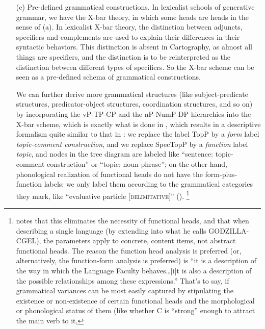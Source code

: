 \documentclass[UTF8, a4paper, oneside, scheme=plain, 12pt]{ctexrep}
\newcommand*{\term}[1]{\emph{#1}}
\newcommand*{\category}[1]{\textsc{#1}}
\begin{document}
{\begin{itemize}
    \item[(c)] Pre-defined grammatical constructions.
    In lexicalist schools of generative grammar,
    we have the X-bar theory, in which some heads are heads in the sense of (a).
    In lexicalist X-bar theory, the distinction between adjuncts, specifiers and complements
    are used to explain their differences in their syntactic behaviors.
    This distinction is absent in Cartography,
    as almost all things are specifiers, and the distinction is to be reinterpreted
    as the distinction between different types of specifiers.
    So the X-bar scheme can be seen as a pre-defined schema of grammatical constructions.
    
    We can further derive more grammatical structures 
    (like subject-predicate structures, predicator-object structures, coordination structures, and so on)
    by incorporating the vP-TP-CP and the nP-NumP-DP hierarchies into the X-bar scheme,
    which is exactly what is done in \citet{deng2010formal},
    which results in a descriptive formalism quite similar to that in \citet{cgel}:
    we replace the label TopP by a \term{form} label \term{topic-comment construction},
    and we replace SpecTopP by a \term{function} label \term{topic},
    and nodes in the tree diagram are labeled like ``sentence: topic-comment construction''
    or ``topic: noun phrase'';
    on the other hand, phonological realization of functional heads
    do not have the form-plus-function labels:
    we only label them according to the grammatical categories they mark,
    like ``evaluative particle [\category{delimitative}]'' ().%
    \footnote{
        \citet{culicover2004cambridge} notes that this eliminates the necessity of functional heads,
        and that when describing a single language (by extending \citet{cgel} into what he calls GODZILLA-CGEL),
        the parameters apply to concrete, content items, not abstract functional heads.
        The reason the function head analysis is preferred (or, alternatively, the function-form analysis is preferred) is 
        ``it is a description of the way in which the Language Faculty behaves\dots [i]t is also a description of the possible relationships among these expressions.''
        That's to say, if grammatical variances can be most easily captured by
        stipulating the existence or non-existence of certain functional heads
        and the morphological or phonological status of them
        (like whether C is ``strong'' enough to attract the main verb to it,
}
\end{itemize}}
\end{document}
